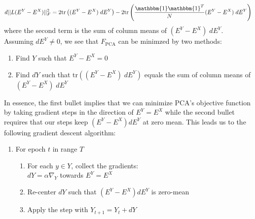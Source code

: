 \documentclass{article}
\theoremstyle{definition}
\begin{document}
\begin{equation}
    d ||L (E^Y - E^X) ||_F^2 = 2 \text{tr}\left( (E^Y - E^X) \; dE^Y \right) - 2 \text{tr}\left( \frac{\mathbbm{1} \mathbbm{1}^T}{N} (E^Y - E^X)
    \; dE^Y \right) 
\end{equation}
where the second term is the sum of column means of $(E^Y - E^X) \; dE^Y$. Assuming $dE^Y \neq 0$, we see that $F_{\text{PCA}}$ can be minimzed by two methods:

\begin{enumerate}
        \item Find $Y$ such that $E^Y - E^X = 0$
        \item Find $dY$ such that $\text{tr}\left( (E^Y - E^X) \; dE^Y \right)$ equals the sum of column means of $(E^Y - E^X) \; dE^Y$ 
\end{enumerate}

In essence, the first bullet implies that we can minimize PCA's objective function by taking gradient steps in the direction of $E^Y = E^X$ while the second
bullet requires that our steps keep $(E^Y - E^X)dE^Y$ at zero mean. This leads us to the following gradient descent algorithm:
\begin{enumerate}
        \item For epoch $t$ in range $T$
        \begin{enumerate}
            \item For each $y \in Y$, collect the gradients: \\
                $dY = \alpha \nabla_Y$ towards $E^Y = E^X$
            \item Re-center $dY$ such that $(E^Y - E^X) dE^Y$ is zero-mean
            \item Apply the step with $Y_{t+1} = Y_t + dY$
        \end{enumerate}
\end{enumerate}

\printbibliography
\end{document}
